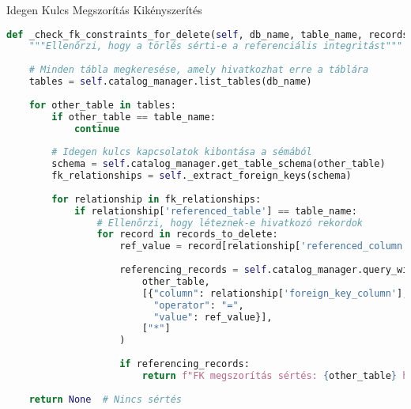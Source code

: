 \documentclass[aspectratio=169]{beamer}
\begin{document}
\begin{frame}[fragile]{Idegen Kulcs Megszorítás Kikényszerítés}
\begin{lstlisting}[language=Python]
def _check_fk_constraints_for_delete(self, db_name, table_name, records_to_delete):
    """Ellenőrzi, hogy a törlés sérti-e a referenciális integritást"""
    
    # Minden tábla megkeresése, amely hivatkozhat erre a táblára
    tables = self.catalog_manager.list_tables(db_name)
    
    for other_table in tables:
        if other_table == table_name:
            continue
            
        # Idegen kulcs kapcsolatok kibontása a sémából
        schema = self.catalog_manager.get_table_schema(other_table)
        fk_relationships = self._extract_foreign_keys(schema)
        
        for relationship in fk_relationships:
            if relationship['referenced_table'] == table_name:
                # Ellenőrzi, hogy léteznek-e hivatkozó rekordok
                for record in records_to_delete:
                    ref_value = record[relationship['referenced_column']]
                    
                    referencing_records = self.catalog_manager.query_with_condition(
                        other_table, 
                        [{"column": relationship['foreign_key_column'], 
                          "operator": "=", 
                          "value": ref_value}], 
                        ["*"]
                    )
                    
                    if referencing_records:
                        return f"FK megszorítás sértés: {other_table} hivatkozik {table_name}-ra"
    
    return None  # Nincs sértés
\end{lstlisting}
\end{frame}
\end{document}
